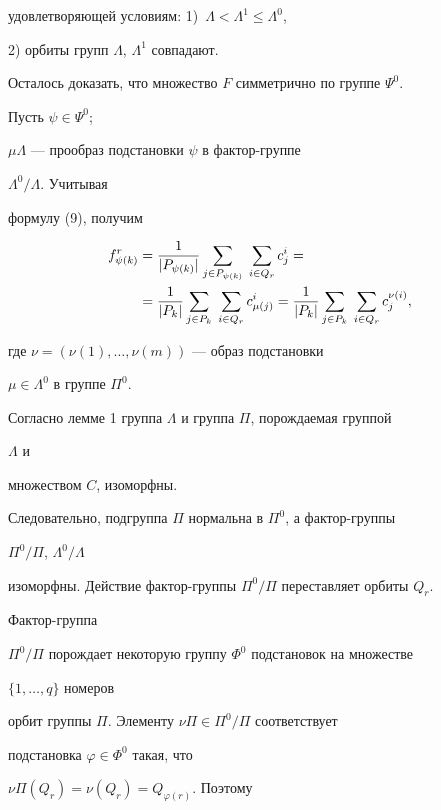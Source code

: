 \begin{pf}
удовлетворяющей условиям: 1)~$\Lambda<\Lambda^1\le\Lambda^0$,


2) орбиты групп $\Lambda$, $\Lambda^1$ совпадают.





Осталось доказать, что множество $F$ симметрично по группе $\Psi^0$.


Пусть $\psi\in\Psi^0$;


$\mu\Lambda$ --- прообраз подстановки $\psi$ в фактор-группе


$\Lambda^0/\Lambda$. Учитывая


формулу (9), получим


\begin{align}


f^r_{\psi(k)}&=\frac{1}{|P_{\psi(k)}|}\sum_{j\in P_{\psi(k)}}\;


\sum_{i\in Q_r}c^i_j=\notag\\


&=\frac{1}{|P_k|}\sum_{j\in P_k}\;\sum_{i\in Q_r}c^i_{\mu(j)}


=\frac{1}{|P_k|}\sum_{j\in P_k}\;\sum_{i\in Q_r}c^{\nu(i)}_j,


\end{align}


где $\nu=(\nu(1),\dotsc,\nu(m))$ --- образ подстановки


$\mu\in\Lambda^0$ в группе $\Pi^0$.


Согласно лемме 1 группа $\Lambda$ и группа $\Pi$, порождаемая группой


$\Lambda$ и


множеством $C$, изоморфны.


Следовательно, подгруппа $\Pi$ нормальна в $\Pi^0$, а фактор-группы


$\Pi^0/\Pi$, $\Lambda^0/\Lambda$


изоморфны. Действие фактор-группы $\Pi^0/\Pi$ переставляет орбиты $Q_r$.


Фактор-группа


$\Pi^0/\Pi$ порождает некоторую группу $\Phi^0$ подстановок на множестве


$\{1,\dotsc,q\}$ номеров


орбит группы $\Pi$. Элементу $\nu\Pi\in\Pi^0/\Pi$ соответствует


подстановка $\varphi\in\Phi^0$ такая, что


$\nu\Pi(Q_r)=\nu(Q_r)=Q_{\varphi(r)}$. Поэтому


\begin{equation}



\end{equation}
\end{pf}
